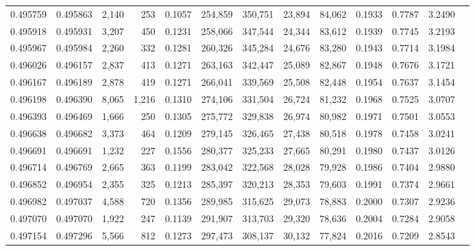 \begin{tabular}{rrrrrrrrrrrrr}
0.495759 & 0.495863 &  2,140 &   253 &                                     0.1057 & 254,859 & 350,751 &  23,894 &  84,062 & 0.1933 & 0.7787 & 3.2490 \\
0.495918 & 0.495931 &  3,207 &   450 &                                     0.1231 & 258,066 & 347,544 &  24,344 &  83,612 & 0.1939 & 0.7745 & 3.2193 \\
0.495967 & 0.495984 &  2,260 &   332 &                                     0.1281 & 260,326 & 345,284 &  24,676 &  83,280 & 0.1943 & 0.7714 & 3.1984 \\
0.496026 & 0.496157 &  2,837 &   413 &                                     0.1271 & 263,163 & 342,447 &  25,089 &  82,867 & 0.1948 & 0.7676 & 3.1721 \\
0.496167 & 0.496189 &  2,878 &   419 &                                     0.1271 & 266,041 & 339,569 &  25,508 &  82,448 & 0.1954 & 0.7637 & 3.1454 \\
0.496198 & 0.496390 &  8,065 & 1,216 &                                     0.1310 & 274,106 & 331,504 &  26,724 &  81,232 & 0.1968 & 0.7525 & 3.0707 \\
0.496393 & 0.496469 &  1,666 &   250 &                                     0.1305 & 275,772 & 329,838 &  26,974 &  80,982 & 0.1971 & 0.7501 & 3.0553 \\
0.496638 & 0.496682 &  3,373 &   464 &                                     0.1209 & 279,145 & 326,465 &  27,438 &  80,518 & 0.1978 & 0.7458 & 3.0241 \\
0.496691 & 0.496691 &  1,232 &   227 &                                     0.1556 & 280,377 & 325,233 &  27,665 &  80,291 & 0.1980 & 0.7437 & 3.0126 \\
0.496714 & 0.496769 &  2,665 &   363 &                                     0.1199 & 283,042 & 322,568 &  28,028 &  79,928 & 0.1986 & 0.7404 & 2.9880 \\
0.496852 & 0.496954 &  2,355 &   325 &                                     0.1213 & 285,397 & 320,213 &  28,353 &  79,603 & 0.1991 & 0.7374 & 2.9661 \\
0.496982 & 0.497037 &  4,588 &   720 &                                     0.1356 & 289,985 & 315,625 &  29,073 &  78,883 & 0.2000 & 0.7307 & 2.9236 \\
0.497070 & 0.497070 &  1,922 &   247 &                                     0.1139 & 291,907 & 313,703 &  29,320 &  78,636 & 0.2004 & 0.7284 & 2.9058 \\
0.497154 & 0.497296 &  5,566 &   812 &                                     0.1273 & 297,473 & 308,137 &  30,132 &  77,824 & 0.2016 & 0.7209 & 2.8543 \\

\end{tabular}
